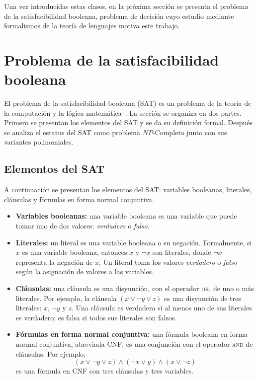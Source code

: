 \documentclass{article}
\theoremstyle{definition}
\theoremstyle{plain}
\theoremstyle{remark}
\begin{document}
Una vez introducidas estas clases, en la próxima sección se presenta
el problema de la satisfacibilidad booleana, problema de decisión cuyo
estudio mediante formalismos de la teoría de lenguajes motiva este
trabajo.

\section{Problema de la satisfacibilidad booleana}
\label{sec:sat}

El problema de la satisfacibilidad booleana (SAT) es un problema de
la teoría de la computación y la lógica
matemática~\cite{hopcroft2006introduction}. La sección se organiza
en dos partes. Primero se presentan los elementos del SAT y se da
su definición formal. Después se analiza el estatus del SAT como
problema $NP$-Completo junto con sus variantes polinomiales.

\subsection{Elementos del SAT}
\label{sec:elementos-sat}

A continuación se presentan los elementos del SAT: variables
booleanas, literales, cláusulas y fórmulas en forma normal conjuntiva.

\begin{itemize}
  \item \textbf{Variables booleanas:} una variable booleana es una
        variable que puede tomar uno de dos valores: \textit{verdadero} o
        \textit{falso}.
  \item \textbf{Literales:} un literal es una variable booleana o su
        negación. Formalmente, si $x$ es una variable booleana, entonces
        $x$ y $\neg x$ son literales, donde $\neg x$ representa la
        negación de $x$. Un literal toma los valores \textit{verdadero} o
        \textit{falso} según la asignación de valores a las variables.
  \item \textbf{Cláusulas:} una cláusula es una disyunción, con el
        operador \textsc{or}, de uno o más literales. Por ejemplo, la cláusula
        $(x \vee \neg y \vee z)$ es una disyunción de tres literales: $x$,
        $\neg y$ y $z$. Una cláusula es verdadera si al menos uno de sus
        literales es verdadero; es falsa si todos sus literales son falsos.
  \item \textbf{Fórmulas en forma normal conjuntiva:} una fórmula
        booleana en forma normal conjuntiva, abreviada CNF, es una
        conjunción con el operador \textsc{and} de cláusulas. Por ejemplo,
        \[
          (x \vee \neg y \vee z) \wedge (\neg x \vee y) \wedge
          (x \vee \neg z)
        \]
        es una fórmula en CNF con tres cláusulas y tres variables.
\end{itemize}
\end{document}
